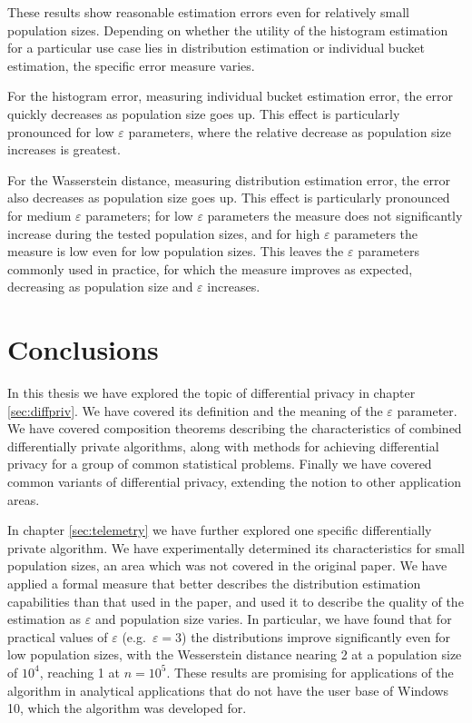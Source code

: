 \documentclass[a4paper,12pt]{article}
\renewcommand{\epsilon}{\varepsilon}
\begin{document}
These results show reasonable estimation errors even for relatively small population sizes. Depending on whether the utility of the histogram estimation for a particular use case lies in distribution estimation or individual bucket estimation, the specific error measure varies.

For the histogram error, measuring individual bucket estimation error, the error quickly decreases as population size goes up. This effect is particularly pronounced for low $\epsilon$ parameters, where the relative decrease as population size increases is greatest.

For the Wasserstein distance, measuring distribution estimation error, the error also decreases as population size goes up. This effect is particularly pronounced for medium $\epsilon$ parameters; for low $\epsilon$ parameters the measure does not significantly increase during the tested population sizes, and for high $\epsilon$ parameters the measure is low even for low population sizes. This leaves the $\epsilon$ parameters commonly used in practice, for which the measure improves as expected, decreasing as population size and $\epsilon$ increases.

\enlargethispage{\baselineskip}

\newpage
\section{Conclusions}

In this thesis we have explored the topic of differential privacy in chapter \ref{sec:diffpriv}. We have covered its definition and the meaning of the $\epsilon$ parameter. We have covered composition theorems describing the characteristics of combined differentially private algorithms, along with methods for achieving differential privacy for a group of common statistical problems. Finally we have covered common variants of differential privacy, extending the notion to other application areas.

In chapter \ref{sec:telemetry} we have further explored one specific differentially private algorithm. We have experimentally determined its characteristics for small population sizes, an area which was not covered in the original paper. We have applied a formal measure that better describes the distribution estimation capabilities than that used in the paper, and used it to describe the quality of the estimation as $\epsilon$ and population size varies. In particular, we have found that for practical values of $\epsilon$ (e.g.\ $\epsilon = 3$) the distributions improve significantly even for low population sizes, with the Wesserstein distance nearing 2 at a population size of $10^4$, reaching 1 at $n=10^5$. These results are promising for applications of the algorithm in analytical applications that do not have the user base of Windows 10, which the algorithm was developed for.
\end{document}
